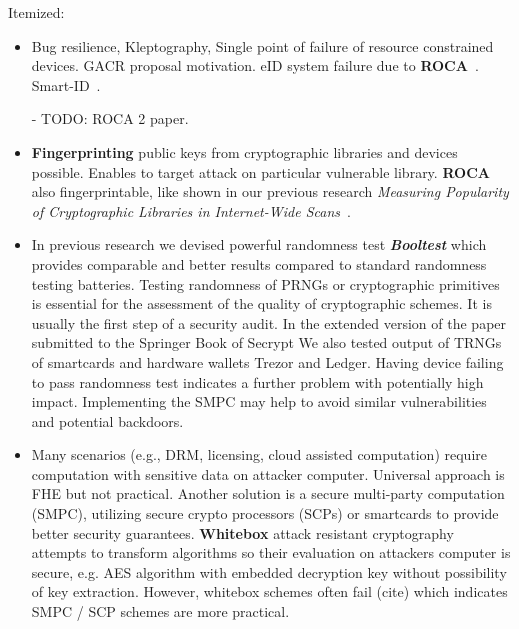 \documentclass[
  digital, %
  twoside, %
  table,   %
  lof,     %
  lot,     %
]{fithesis3}
\newcounter{ph4_show_guides}
\theoremstyle{definition}
\theoremstyle{remark}
\begin{document}
\begin{ecmmnt}  %

Itemized:
\begin{itemize}
	\item Bug resilience, Kleptography, Single point of failure of resource constrained devices. GACR proposal motivation. eID system failure due to {\bf{ROCA}}~\cite{2017-ccs-nemec}. Smart-ID~\cite{smart_id_ee}. 
    
    - TODO: ROCA 2 paper.
        
    \item {\bf{Fingerprinting}} public keys from cryptographic libraries and devices possible. Enables to target attack on particular vulnerable library. {\bf{ROCA}} also fingerprintable, like shown in our previous research {\it{Measuring Popularity of Cryptographic Libraries in Internet-Wide Scans}}~\cite{2017-acsac-nemec}.
    
        \item In previous research we devised powerful randomness test {\bf{\emph{Booltest}}} \cite{booltest_secrypt2017} which provides comparable and better results compared to standard randomness testing batteries. Testing randomness of PRNGs or cryptographic primitives is essential for the assessment of the quality of cryptographic schemes. It is usually the first step of a security audit. In the extended version of the paper submitted to the Springer Book of Secrypt We also tested output of TRNGs of smartcards and hardware wallets Trezor and Ledger. Having device failing to pass randomness test indicates a further problem with potentially high impact. Implementing the SMPC may help to avoid similar vulnerabilities and potential backdoors. 
    
    \item Many scenarios (e.g., DRM, licensing, cloud assisted computation) require computation with sensitive data on attacker computer. Universal approach is FHE but not practical. Another solution is a secure multi-party computation (SMPC), utilizing secure crypto processors (SCPs) or smartcards to provide better security guarantees. {\bf{Whitebox}} attack resistant cryptography \cite{whitebox_klinec_santacrypt2013,Klinec2013thesis} attempts to transform algorithms so their evaluation on attackers computer is secure, e.g. AES algorithm with embedded decryption key without possibility of key extraction. However, whitebox schemes often fail (cite) which indicates SMPC / SCP schemes are more practical.
    

\end{itemize}
\end{ecmmnt}
\end{document}
